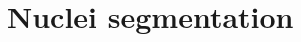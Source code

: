 \documentclass[a4paper,10pt,twocolumn]{article}
\begin{document}



\section{Nuclei segmentation}
\end{document}
